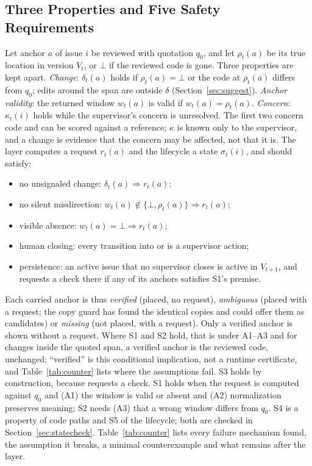 \subsection{Three Properties and Five Safety Requirements}\label{sec:props}
Let anchor $a$ of issue $i$ be reviewed with quotation $q_0$, and let $\rho_t(a)$ be its true location in version $V_t$, or $\bot$ if the reviewed code is gone. Three properties are kept apart. \emph{Change}: $\delta_t(a)$ holds if $\rho_t(a)=\bot$ or the code at $\rho_t(a)$ differs from $q_0$; edits around the span are outside $\delta$ (Section~\ref{sec:suggest}). \emph{Anchor validity}: the returned window $w_t(a)$ is valid if $w_t(a)=\rho_t(a)$. \emph{Concern}: $\kappa_t(i)$ holds while the supervisor's concern is unresolved. The first two concern code and can be scored against a reference; $\kappa$ is known only to the supervisor, and a change is evidence that the concern may be affected, not that it is. The layer computes a request $r_t(a)$ and the lifecycle a state $\sigma_t(i)$, and should satisfy:
\begin{itemize}
\item[\textbf{S1}] no unsignaled change: $\delta_t(a)\Rightarrow r_t(a)$;
\item[\textbf{S2}] no silent misdirection: $w_t(a)\notin\{\bot,\rho_t(a)\}\Rightarrow r_t(a)$;
\item[\textbf{S3}] visible absence: $w_t(a)=\bot\Rightarrow r_t(a)$;
\item[\textbf{S4}] human closing: every transition into  or  is a supervisor action;
\item[\textbf{S5}] persistence: an active issue that no supervisor closes is active in $V_{t+1}$, and requests a check there if any of its anchors satisfies S1's premise.
\end{itemize}
Each carried anchor is thus \emph{verified} (placed, no request), \emph{ambiguous} (placed with a request; the copy guard has found the identical copies and could offer them as candidates) or \emph{missing} (not placed, with a request). Only a verified anchor is shown without a request. Where S1 and S2 hold, that is under A1--A3 and for changes inside the quoted span, a verified anchor is the reviewed code, unchanged; ``verified'' is this conditional implication, not a runtime certificate, and Table~\ref{tab:counter} lists where the assumptions fail. S3 holds by construction, because  requests a check. S1 holds when the request is computed against $q_0$ and (A1) the window is valid or absent and (A2) normalization preserves meaning; S2 needs (A3) that a wrong window differs from $q_0$. S4 is a property of code paths and S5 of the lifecycle; both are checked in Section~\ref{sec:statecheck}. Table~\ref{tab:counter} lists every failure mechanism found, the assumption it breaks, a minimal counterexample and what remains after the layer.

